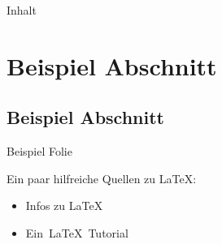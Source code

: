 \documentclass[mathserif,serif,german]{beamer}
\title[Titel] %
{\thisTitle}
\subtitle{\thisSubtitle~ -- \ifgerman \semester \else \semesterEnglish \fi}
\author[\thisAuthor] %
{	
	\ifgerman 
		\thisAuthor~\\ \thisMatNr~\myMatNr~\\{\nolinkurl{\myEmail}} %
	\else 
		\thisAuthor~\\ \thisMatNrEnglish~\myMatNr~\\{\nolinkurl{\myEmail}} %
	\fi
}
\institute[Frankfurt] %
{	
	\ifgerman
		\thisStudyGerman\\
		\thisFacultyGerman\\
		\textbf{\thisInstitute}
	\else
		\thisStudyEnglish\\
		\thisFacultyEnglish\\
		\textbf{\thisInstitute}
	\fi
	
	
}
\date[\today]{\today}
\begin{document}
\def\UrlBreaks{\do\/\do-}
	
\begin{frame}
	\titlepage
\end{frame}


\begin{frame}{Inhalt}
	\setcounter{tocdepth}{1} %
	\tableofcontents
\end{frame}
	

\section{Beispiel Abschnitt}
\subsection{Beispiel Abschnitt}


\begin{frame}{Beispiel Folie}
	
	Ein paar hilfreiche Quellen zu \LaTeX:
	
	\begin{itemize}
		\item Infos zu \LaTeX~\cite{Latex_Project}
		\item Ein~\LaTeX~Tutorial~\cite{Latex_Tutorial}
	\end{itemize}


\end{frame}	
\end{document}
